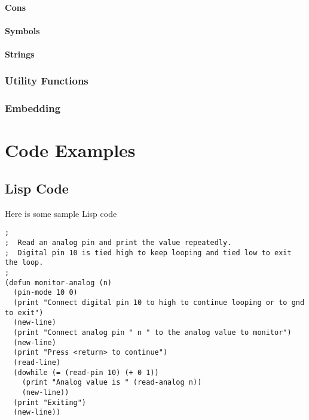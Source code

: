 \documentclass[10pt, openany]{book}
\begin{document}
\subsubsection{Cons}

\subsubsection{Symbols}

\subsubsection{Strings}

\subsection{Utility Functions}
\subsection{Embedding}


\chapter{Code Examples}
\section{Lisp Code}
Here is some sample Lisp code

\lstset{language=lisp}
\begin{lstlisting}
;
;  Read an analog pin and print the value repeatedly.
;  Digital pin 10 is tied high to keep looping and tied low to exit the loop.
;
(defun monitor-analog (n)
  (pin-mode 10 0)
  (print "Connect digital pin 10 to high to continue looping or to gnd to exit")
  (new-line)
  (print "Connect analog pin " n " to the analog value to monitor")
  (new-line)
  (print "Press <return> to continue")
  (read-line)
  (dowhile (= (read-pin 10) (+ 0 1))
    (print "Analog value is " (read-analog n))
    (new-line))
  (print "Exiting")
  (new-line))
\end{lstlisting}
\end{document}

